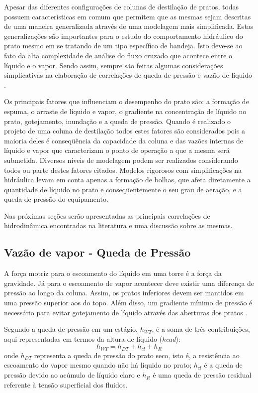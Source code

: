 Apesar das diferentes configurações de colunas de destilação de pratos, todas possuem
características em comum que permitem que as mesmas sejam descritas de uma maneira generalizada através
de uma modelagem mais simplificada. Estas generalizações são importantes para o estudo do comportamento
hidráulico do prato mesmo em se tratando de um tipo específico de bandeja. Isto deve-se ao fato da alta
complexidade de análise do fluxo cruzado que acontece entre o líquido e o vapor. Sendo assim,
sempre são feitas algumas considerações simplicativas na elaboração de correlações de queda de pressão
e vazão de líquido \cite{Khoury:2005}.

Os principais fatores que influenciam o desempenho do prato são: a formação de espuma, o arraste de líquido e vapor,
o gradiente na concentração de líquido no prato, gotejamento, inundação e a queda de pressão.
Quando é realizado o projeto de uma coluna de destilação todos estes fatores são considerados pois a maioria
deles é conseqüência da capacidade da coluna e das vazões internas de líquido e vapor que caracterizam o ponto
de operação a que a mesma será submetida.
Diversos níveis de modelagem podem ser realizados considerando todos ou parte destes fatores citados.
Modelos rigorosos com simplificações na hidráulica levam em conta
apenas a formação de bolhas, que afeta diretamente a quantidade de líquido no prato e conseqüentemente
o seu grau de aeração, e a queda de pressão do equipamento.

Nas próximas seções serão apresentadas as principais correlações de hidrodinâmica encontradas na literatura e uma
discussão sobre as mesmas.

\subsection{Vazão de vapor - Queda de Pressão}\label{sec:vapflow}
A força motriz para o escoamento do líquido em uma torre é a força da gravidade. Já para o escoamento de vapor acontecer
deve existir uma diferença de pressão ao longo da coluna. Assim, os pratos inferiores devem ser mantidos em uma
pressão superior aos do topo. Além disso, um gradiente mínimo de pressão é
necessário para evitar gotejamento de líquido através das aberturas dos pratos \cite{Khoury:2005}.

Segundo  a queda de pressão em um estágio, $h_{WT}$, é a soma de três contribuições,
aqui representadas em termos da altura de líquido (\textit{head}):
\begin{equation}
h_{WT} = h_{DT}+h_{cl}+h_R
\end{equation}
onde $h_{DT}$ representa a queda de pressão do prato seco, isto é, a resistência ao escoamento do vapor mesmo quando
não há líquido no prato; $h_{cl}$ é a queda de pressão devido ao acúmulo de líquido claro e $h_R$ é uma queda de pressão
residual referente à tensão superficial dos fluidos.

